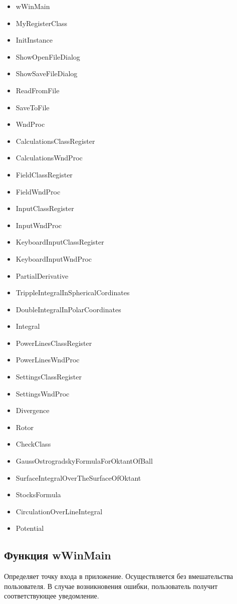 \documentclass[14pt,a4paper,final]{extreport}
\begin{document}
\begin{itemize}
	\item  wWinMain
	\item  MyRegisterClass
	\item  InitInstance
	\item  ShowOpenFileDialog
	\item  ShowSaveFileDialog
	\item  ReadFromFile
	\item  SaveToFile
	\item  WndProc
	\item  CalculationsClassRegister
	\item  CalculationsWndProc
	\item  FieldClassRegister
	\item  FieldWndProc
	\item  InputClassRegister
	\item  InputWndProc
	\item  KeyboardInputClassRegister
	\item  KeyboardInputWndProc
	\item  PartialDerivative
	\item  TrippleIntegralInSphericalCordinates
	\item  DoubleIntegralInPolarCoordinates
	\item  Integral
	\item  PowerLinesClassRegister
	\item  PowerLinesWndProc
	\item  SettingsClassRegister
	\item  SettingsWndProc
	\item  Divergence
	\item  Rotor
	\item  CheckClass
	\item  GaussOstrogradskyFormulaForOktantOfBall
	\item  SurfaceIntegralOverTheSurfaceOfOktant
	\item  StocksFormula
	\item  CirculationOverLineIntegral
	\item  Potential
\end{itemize}

\subsection{Функция wWinMain}
Определяет точку входа в приложение. Осуществляется без вмешательства пользователя. 
В случае возникновения ошибки, пользователь получит соответствующее уведомление.
\end{document}
